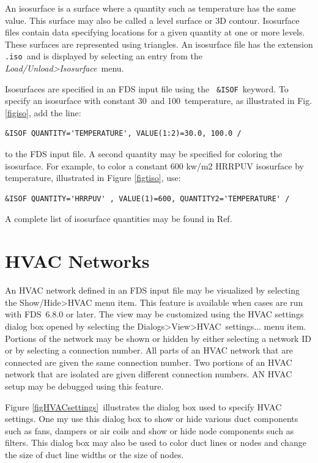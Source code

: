 \documentclass[11pt,twoside]{book}
\newcommand{\fedb}{}
\begin{document}
An isosurface is a surface where a quantity such as temperature has the same
value. This surface may also be called a
level surface or 3D contour. Isosurface files contain data
specifying locations for a given quantity at one or
more levels. These surfaces are represented using triangles.
An isosurface file has the extension {\tt .iso}\ and is
displayed by selecting an entry from the {\em Load/Unload>Isosurface}\ menu.

Isosurfaces are specified in an FDS input file using the {\tt
\&ISOF}\ keyword.  To specify an isosurface with constant
30\degC\ and 100\degC\ temperature, as illustrated in Fig. \ref{figiso}, add
the line:
\begin{lstlisting}
&ISOF QUANTITY='TEMPERATURE', VALUE(1:2)=30.0, 100.0 /
\end{lstlisting}
to the FDS input file.
A second quantity may be specified for coloring the isosurface.
For example, to color a constant 600 kw/m2 HRRPUV isosurface by temperature,
illustrated in Figure \ref{figtiso},
use:
\begin{lstlisting}
&ISOF QUANTITY='HRRPUV' , VALUE(1)=600, QUANTITY2='TEMPERATURE' /
\end{lstlisting}
A complete list of isosurface quantities
may be found in Ref.~\cite{FDS_Users_Guide}

\fedb

\section{HVAC Networks}

An HVAC network defined in an FDS input file may be visualized  by
selecting the Show/Hide>HVAC menu item.  This feature is available when cases are run with FDS~6.8.0 or later.
The view may be customized using the
HVAC settings dialog box opened by selecting the Dialogs>View>HVAC~settings... menu item.
Portions of the network may be shown or hidden by either selecting a network ID or
by selecting a connection number.  All parts of an HVAC network that are connected
are given the same connection number.  Two portions of an HVAC network
that are isolated are given different connection numbers.  AN HVAC setup may
be debugged using this feature.

Figure \ref{figHVACsettings}\ illustrates the dialog box used to specify HVAC settings.
One my use this dialog box to show or hide various duct components such as fans, dampers
or air coils and show or hide node
components such as filters. This dialog box may also be used to color duct lines or nodes and change the
size of duct line widths or the size of nodes.
\end{document}
